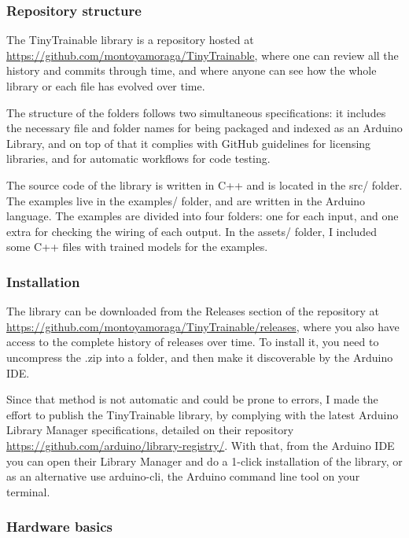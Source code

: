 \subsubsection{Repository structure}

The TinyTrainable library is a repository hosted at \url{https://github.com/montoyamoraga/TinyTrainable}, where one can review all the history and commits through time, and where anyone can see how the whole library or each file has evolved over time.

The structure of the folders follows two simultaneous specifications: it includes the necessary file and folder names for being packaged and indexed as an Arduino Library, and on top of that it complies with GitHub guidelines for licensing libraries, and for automatic workflows for code testing.

The source code of the library is written in C++ and is located in the src/ folder. The examples live in the examples/ folder, and are written in the Arduino language. The examples are divided into four folders: one for each input, and one extra for checking the wiring of each output. In the assets/ folder, I included some C++ files with trained models for the examples.

\subsubsection{Installation}

The library can be downloaded from the Releases section of the repository at  \url{https://github.com/montoyamoraga/TinyTrainable/releases}, where you also have access to the complete history of releases over time. To install it, you need to uncompress the .zip into a folder, and then make it discoverable by the Arduino IDE.

Since that method is not automatic and could be prone to errors, I made the effort to publish the TinyTrainable library, by complying with the latest Arduino Library Manager specifications, detailed on their repository \url{https://github.com/arduino/library-registry/}. With that, from the Arduino IDE you can open their Library Manager and do a 1-click installation of the library, or as an alternative use arduino-cli, the Arduino command line tool on your terminal.

\subsubsection{Hardware basics}

